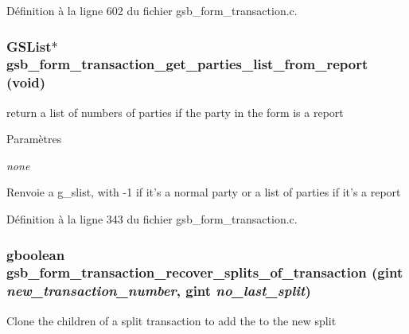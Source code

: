 Définition à la ligne 602 du fichier gsb\_\-form\_\-transaction.c.

\subsubsection[{gsb\_\-form\_\-transaction\_\-get\_\-parties\_\-list\_\-from\_\-report}]{\setlength{\rightskip}{0pt plus 5cm}GSList$\ast$ gsb\_\-form\_\-transaction\_\-get\_\-parties\_\-list\_\-from\_\-report (void)}\label{gsb__form__transaction_8h_aa06a7043f1bd2f313d841b74b600a450}
return a list of numbers of parties if the party in the form is a report


\begin{DoxyParams}{Paramètres}
\item[{\em none}]\end{DoxyParams}
\begin{DoxyReturn}{Renvoie}
a g\_\-slist, with -\/1 if it's a normal party or a list of parties if it's a report 
\end{DoxyReturn}


Définition à la ligne 343 du fichier gsb\_\-form\_\-transaction.c.

\subsubsection[{gsb\_\-form\_\-transaction\_\-recover\_\-splits\_\-of\_\-transaction}]{\setlength{\rightskip}{0pt plus 5cm}gboolean gsb\_\-form\_\-transaction\_\-recover\_\-splits\_\-of\_\-transaction (gint {\em new\_\-transaction\_\-number}, \/  gint {\em no\_\-last\_\-split})}\label{gsb__form__transaction_8h_a318ee36f5765d28282106ff7b844b5ec}
Clone the children of a split transaction to add the to the new split


